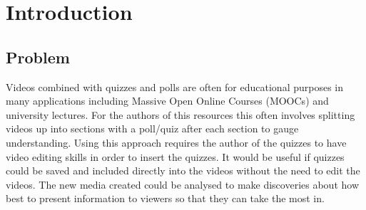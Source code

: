 \chapter{Introduction} 
\label{Chapter:Introduction}
\section{Problem} 
\label{Section:Problem}
Videos combined with quizzes and polls are often for educational purposes in many applications including Massive Open Online Courses (MOOCs) and university lectures. For the authors of this resources this often involves splitting videos up into sections with a poll/quiz after each section to gauge understanding. Using this approach requires the author of the quizzes to have video editing skills in order to insert the quizzes. It would be useful if quizzes could be saved and included directly into the videos without the need to edit the videos. The new media created could be analysed to make discoveries about how best to present information to viewers so that they can take the most in. 

